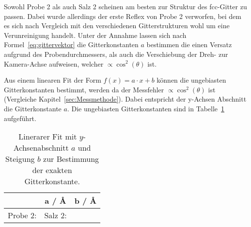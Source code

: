 Sowohl Probe 2 als auch Salz 2 scheinen am besten zur Struktur des fcc-Gitter zu
passen.
Dabei wurde allerdings der erste Reflex von Probe 2 verworfen, bei dem es sich
nach Vergleich mit den verschiedenen Gitterstrukturen wohl um eine Verunreinigung
handelt.
Unter der Annahme lassen sich nach Formel~\eqref{eq:gittervektor} die
Gitterkonstanten $a$ bestimmen die einen Versatz aufgrund des
Probendurchmessers, als auch die Verschiebung der Dreh- zur Kamera-Achse
aufweisen, welcher $\propto \cos^2(\theta)$ ist.

Aus einem linearen Fit der Form $f(x) = a \cdot x + b$ können die ungebiasten
Gitterkonstanten bestimmt, werden da der Messfehler $\propto \cos^2(\theta)$ ist
(Vergleiche Kapitel~\ref{sec:Messmethode}).
Dabei entspricht der y-Achsen Abschnitt die Gitterkonstante $a$.
Die ungebiasten Gitterkonstanten sind in Tabelle~\ref{tab:gitt} aufgeführt.

\begin{table}[ht]
		\centering
		\caption{Linerarer Fit mit $y$-Achsenabschnitt $a$ und Steigung $b$ zur
				Bestimmung der exakten Gitterkonstante.}
		\label{tab:gitt}
		\begin{tabular}{l c c}
				\toprule
        & a / \AA & b / \AA \\
				\midrule
				Probe 2: 	& 
				Salz 2: 	& 
				\bottomrule
		\end{tabular}
\end{table}
